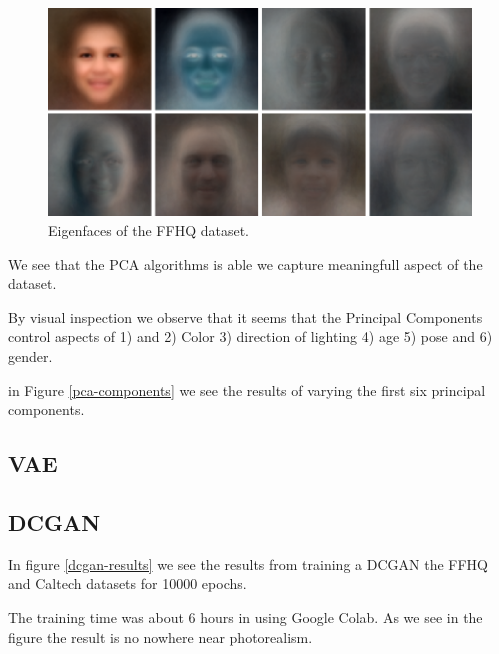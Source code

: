 \begin{figure}
  \includegraphics[width=\textwidth]{fig/PCA/pca}
  \caption{Eigenfaces of the FFHQ dataset.}
  \label{eigenface}
\end{figure}

We see that the PCA algorithms is able we capture meaningfull aspect of the dataset.

By visual inspection we observe that it seems that the Principal Components control aspects of 1) and 2) Color 3) direction of lighting 4) age 5) pose and 6) gender.

in Figure \ref{pca-components} we see the results of varying the first six
principal components.


\subsection{VAE}





\subsection{DCGAN}
In figure \ref{dcgan-results} we see the results from training a DCGAN the FFHQ and Caltech datasets for 10000 epochs.

The training time was about 6 hours in using Google Colab. As we see in the figure the result is no nowhere near photorealism.

